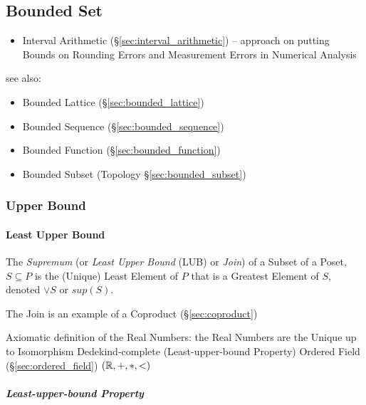 \subsection{Bounded Set}\label{sec:bounded_set}

\begin{itemize}
  \item Interval Arithmetic (\S\ref{sec:interval_arithmetic}) -- approach on
    putting Bounds on Rounding Errors and Measurement Errors in Numerical
    Analysis
\end{itemize}

see also:
\begin{itemize}
  \item Bounded Lattice (\S\ref{sec:bounded_lattice})
  \item Bounded Sequence (\S\ref{sec:bounded_sequence})
  \item Bounded Function (\S\ref{sec:bounded_function})
  \item Bounded Subset (Topology \S\ref{sec:bounded_subset})
\end{itemize}



\subsubsection{Upper Bound}\label{sec:upper_bound}



\paragraph{Least Upper Bound}\label{sec:least_upperbound}\hfill

The \emph{Supremum} (or \emph{Least Upper Bound} (LUB) or \emph{Join})
of a Subset of a Poset, $S \subseteq P$ is the (Unique) Least Element
of $P$ that is a Greatest Element of $S$, denoted $\vee S$ or $sup
(S)$.

The Join is an example of a Coproduct (\S\ref{sec:coproduct})

Axiomatic definition of the Real Numbers: the Real Numbers are the Unique up to
Isomorphism Dedekind-complete (Least-upper-bound Property) Ordered Field
(\S\ref{sec:ordered_field}) $(\mathbb{R}, +, *, <)$



\subparagraph{Least-upper-bound Property}
\label{sec:leastupperbound_property}\hfill



